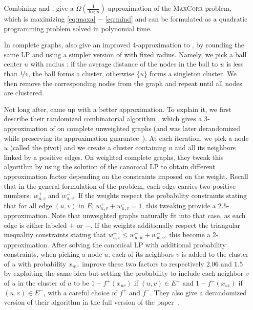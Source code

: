 Combining \mind{} and \maxa{}, \textcite[Section 4]{Charikar2004} give a $\Omega(\frac{1}{\log n})$
approximation of the \textsc{MaxCorr} problem, which is maximizing \eqref{eq:maxa} $-$ \eqref{eq:mind}
and can be formulated as a quadratic programming problem solved in polynomial time.

In complete graphs, \textcite[Section 3]{Charikar2003} also give an improved $4$-approximation to
\mind{}, by rounding the same LP and using a simpler version of \regionGrow{} with fixed radius.
Namely, we pick a ball center $u$ \uar{} with radius \shalf{}: if the average distance of the nodes
in the ball to $u$ is less than $\nicefrac{1}{4}$, the ball forms a cluster, otherwise $\{u\}$ forms
a singleton cluster. We then remove the corresponding nodes from the graph and repeat until all
nodes are clustered.

Not long after, \textcite{CCPivotConf05} came up with a better approximation. To explain it, we
first describe their randomized combinatorial algorithm \ccpivot{}, which gives a $3$-approximation
of \mind{} on complete unweighted graphs (and was later derandomized while preserving its
approximation guarantee~\autocite{derandomCCPivot08}). At each iteration, we pick a node $u$ \uar{}
(called the pivot) and we create a cluster containing $u$ and all its neighbors
linked by a positive edges. On weighted complete graphs, they tweak this algorithm by using the
solution of the canonical LP to obtain different approximation factor depending on the
constraints imposed on the weight. Recall that in the general formulation of the problem, each
edge carries two positive numbers: $w_{u,v}^+$ and $w_{u,v}^-$. If the weights respect the
probability constraints stating that for all edge $(u,v)$ in $E$, $w_{u,v}^+ + w_{u,v}^- = 1$, this
tweaking provide a $2.5$-approximation. Note that unweighted graphs naturally fit into that case, as
each edge is either labeled $+$ or $-$. If the weights
additionally respect the triangular inequality constraints stating that $w_{u,v}^- \leq w_{u,w}^- +
w_{w,v}^-$, this become a $2$-approximation. After solving the canonical LP with additional
probability constraints, when picking a node $u$, each of its neighbors $v$ is added to the cluster
of $u$ with probability $x_{uv}$. \Textcite{Chawla2014} improve these two factors to respectively
$2.06$ and $1.5$ by exploiting the same idea but setting the probability to include each neighbor
$v$ of $u$ in the cluster of $u$ to be $1-f^+(x_{uv})$ if $(u,v)\in E^+$ and $1-f^-(x_{uv})$ if
$(u,v)\in E^-$, with a careful choice of $f^+$ and $f^-$. They also give a derandomized version of
their algorithm in the full version of the paper~\autocite[Theorem 23]{ChawlaArxiv14}.

